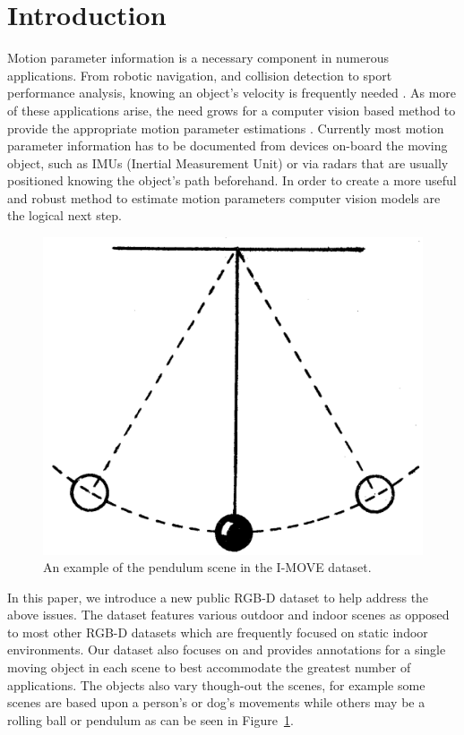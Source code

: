 \section{Introduction}
Motion parameter information is a necessary component in numerous applications. 
From robotic navigation, and collision detection to sport performance analysis, knowing an object's velocity is frequently needed \cite{kasiri2015combat,kasiri2017fine,wattanamongkhol2005method}. 
As more of these applications arise, the need grows for a computer vision based method to provide the appropriate motion parameter estimations \cite{marcon2010structural,miarka2011objectivity,polak2016motion}. 
Currently most motion parameter information has to be documented from devices on-board the moving object, such as IMUs (Inertial Measurement Unit) or via radars that are usually positioned knowing the object's path beforehand. 
In order to create a more useful and robust method to estimate motion parameters computer vision models are the logical next step.

\begin{figure}[t!]
    \includegraphics[width=1.0\columnwidth]{Images/pend.png}
    \caption{
    An example of the pendulum scene in the I-MOVE dataset.
    }\label{fig:pend.png} 
\end{figure}

In this paper, we introduce a new public RGB-D dataset to help address the above issues. 
The dataset features various outdoor and indoor scenes as opposed to most other RGB-D datasets which are frequently focused on static indoor environments. 
Our dataset also focuses on and provides annotations for a single moving object in each scene to best accommodate the greatest number of applications. 
The objects also vary though-out the scenes, for example some scenes are based upon a person's or dog's movements while others may be a rolling ball or pendulum as can be seen in Figure~\ref{fig:pend.png}. 


